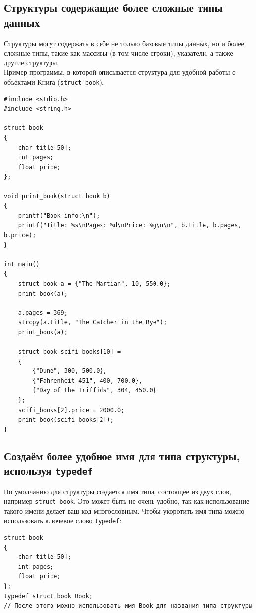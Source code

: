 \documentclass{article}
\begin{document}
\subsection*{Структуры содержащие более сложные типы данных}
Структуры могут содержать в себе не только базовые типы данных, но и более сложные типы, такие как массивы (в том числе строки), указатели, а также другие структуры.\\
Пример программы, в которой описывается структура для удобной работы с объектами Книга (\texttt{struct book}).
\begin{lstlisting}
#include <stdio.h>
#include <string.h>

struct book 
{
    char title[50];
    int pages;
    float price;
};

void print_book(struct book b) 
{
    printf("Book info:\n");
    printf("Title: %s\nPages: %d\nPrice: %g\n\n", b.title, b.pages, b.price);
}

int main() 
{
    struct book a = {"The Martian", 10, 550.0};
    print_book(a);
    
    a.pages = 369;
    strcpy(a.title, "The Catcher in the Rye");
    print_book(a);
    
    struct book scifi_books[10] = 
    {
        {"Dune", 300, 500.0}, 
        {"Fahrenheit 451", 400, 700.0},
        {"Day of the Triffids", 304, 450.0}
    };
    scifi_books[2].price = 2000.0;
    print_book(scifi_books[2]);
}
\end{lstlisting}

\subsection*{Создаём более удобное имя для типа структуры, используя \texttt{typedef}}
По умолчанию для структуры создаётся имя типа, состоящее из двух слов, например \texttt{struct book}. Это может быть не очень удобно, так как использование такого имени делает ваш код многословным. Чтобы укоротить имя типа можно использовать ключевое слово \texttt{typedef}:
\begin{lstlisting}
struct book 
{
    char title[50];
    int pages;
    float price;
};
typedef struct book Book;
// После этого можно использовать имя Book для названия типа структуры
\end{lstlisting}


\newpage
\end{document}

